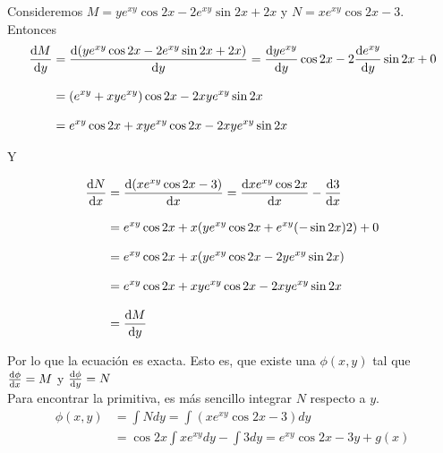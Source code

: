 \documentclass[14pt]{extarticle}
\begin{document}
\begin{enumerate}
{\begin{enumerate}
{                    \color{azul}
                    Consideremos $M = ye^{xy}\cos{2x}-2e^{xy}\sin{2x}+2x$ y $N =
                    xe^{xy}\cos{2x}-3$. \\[.3cm]
                    
                    Entonces
                    \begin{align*}
                        \dv{M}{y}
                        &= \dv{(ye^{xy}\cos{2x}-2e^{xy}\sin{2x}+2x)}{y}
                        = \dv{ye^{xy}}{y}\cos{2x} - 2\dv{e^{xy}}{y}\sin{2x} + 0 \\[.3cm]
                        &= (e^{xy} + xye^{xy}) \cos{2x}- 2xye^{xy}\sin{2x} \\[.3cm]
                        &= e^{xy}\cos{2x} + xye^{xy}\cos{2x} - 2xye^{xy}\sin{2x}
                    \end{align*}
                    
                    Y
                    
                    \begin{align*}
                        \dv{N}{x}
                        &= \dv{(xe^{xy}\cos{2x}-3)}{x} = \dv{xe^{xy}\cos{2x}}{x}
                        -\dv{3}{x} \\[.3cm]
                        &= e^{xy}\cos{2x} + x (ye^{xy}\cos{2x}
                        + e^{xy}(-\sin{2x})2) + 0 \\[.3cm]
                        &= e^{xy}\cos{2x} + x(ye^{xy}\cos{2x} - 2ye^{xy}\sin{2x})\\[.3cm]
                        &= e^{xy}\cos{2x} + xye^{xy}\cos{2x} - 2xye^{xy}\sin{2x}\\[.3cm]
                        &= \dv{M}{y}
                    \end{align*}
                    
                    Por lo que la ecuación es exacta. Esto es, que existe una
                    $\phi(x, y)$ tal que $\dv{\phi}{x} = M$ y $\dv{\phi}{y} = N$\\[.3cm]
                    
                    Para encontrar la primitiva, es más sencillo integrar $N$
                    respecto a $y$.
                    \begin{align*}
                        \phi(x, y) &= \int{N dy}
                        = \int{(xe^{xy}\cos{2x}-3) dy} \\[.3cm]
                        &= \cos{2x} \int{xe^{xy} dy} - \int{3dy}
                        = e^{xy}\cos{2x} - 3y + g(x)
                    \end{align*}
                    
}
\end{enumerate}}
\end{enumerate}
\end{document}
